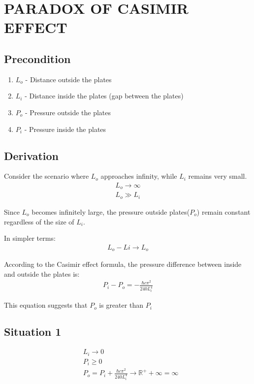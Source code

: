 \section{PARADOX OF CASIMIR EFFECT}


\subsection*{Precondition}
\begin{enumerate}
    \item \(L_o\) - Distance outside the plates
    \item \(L_i\) - Distance inside the plates (gap between the plates)
    \item \(P_o\) - Pressure outside the plates
    \item \(P_i\) - Pressure inside the plates
\end{enumerate}

\subsection*{Derivation}
Consider the scenario where  $L_o$ approaches infinity, while $L_i$ remains very small.
\begin{align}
    L_o \rightarrow \infty \\
    L_o \gg L_i
\end{align}

Since $L_o$ becomes infinitely large, the pressure outside plates($P_o$) remain constant regardless of the size of $L_i$.

\noindent In simpler terms:
\begin{align}L_o - Li \rightarrow L_o\end{align}

According to the Casimir effect formula\citep*{Casimir:1948dh}, the pressure difference between inside and outside the plates is:
\begin{align}P_i - P_o = -\frac{\hbar c \pi^2}{240 L_i^4}\end{align}

This equation suggests that $P_o$ is greater than $P_i$

\subsection*{Situation 1}
\begin{align}
    &L_i \rightarrow 0 \\
    &P_i \ge 0 \\
    &P_o = P_i + \frac{\hbar c \pi^2}{240 L_i^4} \rightarrow {\mathbb{R}}^+ + \infty = \infty
\end{align}

